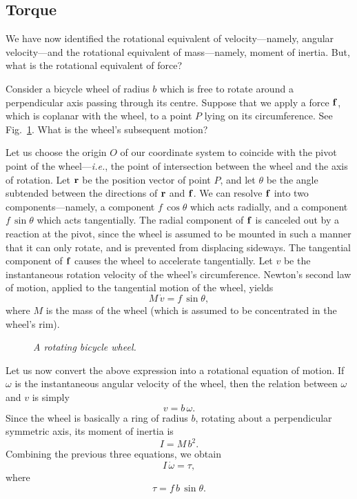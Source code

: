\subsection{Torque}
We have now identified the rotational equivalent of velocity---namely, angular velocity---and
the rotational equivalent of mass---namely, moment of inertia. But, what is the
rotational equivalent of force? 

Consider a bicycle wheel of radius $b$ which is free to rotate around a perpendicular
axis passing through its centre. Suppose that we apply a force ${\bf f}$, which is coplanar with
the wheel, to a
point $P$ lying on its circumference. See Fig.~\ref{f80}.
What is the wheel's subsequent motion?

Let us choose the origin $O$ of our coordinate system to coincide with the pivot
point of the wheel---{\em i.e.}, the point of intersection between the wheel and the axis
of rotation. Let ${\bf r}$ be the position vector of point $P$, and let $\theta$
be the angle subtended between the directions of ${\bf r}$ and 
${\bf f}$. We can resolve ${\bf f}$ into two components---namely, a component $f\,\cos\theta$
which acts radially, and a  component $f\,\sin\theta$ which acts tangentially. The radial
component of ${\bf f}$ is canceled out by a reaction at the pivot, since the wheel
is assumed to be mounted in such a manner that it  can only rotate, and is prevented from
displacing sideways. The tangential component of ${\bf f}$ causes the wheel to
accelerate tangentially. Let $v$ be the instantaneous rotation velocity of the wheel's
circumference. Newton's second law of motion, applied to the tangential motion of the
wheel, yields
\begin{equation}
M\,\dot{v} = f\,\sin\theta,
\end{equation}
where $M$ is the mass of the wheel (which is assumed to be concentrated in the wheel's rim).

\begin{figure}
\epsfysize=2in
\centerline{}
\caption{\em A rotating bicycle wheel.}\label{f80}  
\end{figure}

Let us now  convert the above expression into a rotational equation
of motion. If $\omega$ is the instantaneous angular velocity of the wheel, then
the relation between $\omega$ and $v$ is simply
\begin{equation}
v = b\,\omega.
\end{equation}
Since the wheel is basically a ring of radius $b$, rotating about a perpendicular
symmetric axis, its moment of inertia is 
\begin{equation}
I = M\,b^2. 
\end{equation}
Combining the previous three equations, we obtain
\begin{equation}\label{e8ang}
I \,\dot{\omega} = \tau,
\end{equation}
where 
\begin{equation}\label{e8tor}
\tau = f\,b\,\sin\theta.
\end{equation}

